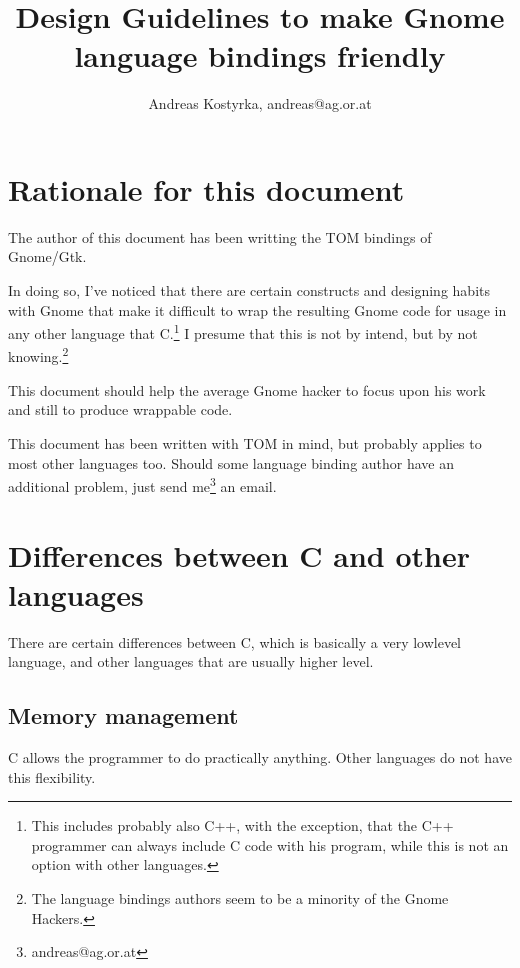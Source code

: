\documentclass{article}
\begin{document}
\title{Design Guidelines to make Gnome language bindings friendly}
\author{Andreas Kostyrka, andreas@ag.or.at}
\maketitle
\tableofcontents
\section{Rationale for this document}
The author of this document has been writting the TOM bindings of
Gnome/Gtk.

In doing so, I've noticed that there are certain constructs and
designing habits with Gnome that make it difficult to wrap the
resulting Gnome code for usage in any other language that
C.\footnote{This includes probably also C++, with the exception, that
the C++ programmer can always include C code with his program, while
this is not an option with other languages.}
I presume that this is not by intend, but by not knowing.\footnote{The
language bindings authors seem to be a minority of the Gnome Hackers.}

This document should help the average Gnome hacker to focus upon his
work and still to produce wrappable code.

This document has been written with TOM in mind, but probably applies
to most other languages too. Should some language binding author have
an additional problem, just send me\footnote{andreas@ag.or.at} an
email.

\section{Differences between C and other languages}

There are certain differences between C, which is basically a very
lowlevel language, and other languages that are usually higher level.

\subsection{Memory management}

C allows the programmer to do practically anything. Other languages do
not have this flexibility.
\end{document}
